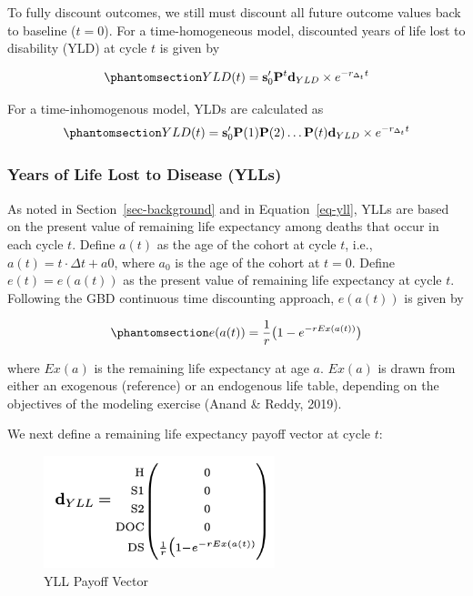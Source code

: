\documentclass[
]{agujournal2019}
\begin{document}
To fully discount outcomes, we still must discount all future outcome
values back to baseline (\(t=0\)). For a time-homogeneous model,
discounted years of life lost to disability (YLD) at cycle \(t\) is
given by

\begin{equation}\phantomsection\label{eq-yldt}{
YLD(t)=\mathbf{s}'_0 \mathbf{P}^t \mathbf{d}_{YLD}  \times{e^{-r_{\Delta_t} t}}
}\end{equation}

For a time-inhomogenous model, YLDs are calculated as
\begin{equation}\phantomsection\label{eq-yldt-inhomo}{
YLD(t)=\mathbf{s}'_0 \mathbf{P}(1)\mathbf{P}(2)\dots\mathbf{P}(t)  \mathbf{d}_{YLD}  \times{e^{-r_{\Delta_t} t}}
}\end{equation}

\subsubsection{Years of Life Lost to Disease
(YLLs)}\label{years-of-life-lost-to-disease-ylls}

As noted in Section~\ref{sec-background} and in Equation~\ref{eq-yll},
YLLs are based on the present value of remaining life expectancy among
deaths that occur in each cycle \(t\). Define \(a(t)\) as the age of the
cohort at cycle \(t\), i.e., \(a(t) = t \cdot \Delta t + a0\), where
\(a_0\) is the age of the cohort at \(t=0\). Define \(e(t)=e(a(t))\) as
the present value of remaining life expectancy at cycle \(t\). Following
the GBD continuous time discounting approach, \(e(a(t))\) is given by

\begin{equation}\phantomsection\label{eq-pvEx}{
e(a(t)) = \frac{1}{r}\big (1 - e^{-rEx(a(t))} \big )
}\end{equation}

where \(Ex(a)\) is the remaining life expectancy at age \(a\). \(Ex(a)\)
is drawn from either an exogenous (reference) or an endogenous life
table, depending on the objectives of the modeling exercise (Anand \&
Reddy, 2019).

We next define a remaining life expectancy payoff vector at cycle \(t\):

\begin{figure}[H]

{\centering \includegraphics[width=0.6\textwidth,height=\textheight]{images/d_yll.png}

}

\caption{YLL Payoff Vector}

\end{figure}%
\end{document}
